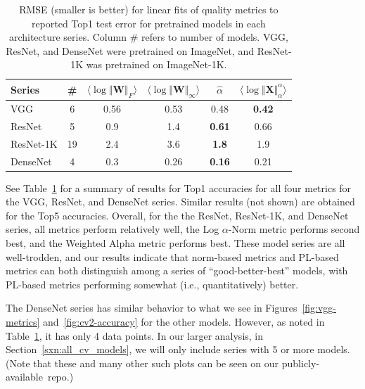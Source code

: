 \begin{table}[t]
\small
\begin{center}
\begin{tabular}{|p{1in}|c|c|c|c|c|}
\hline
 Series    &\#   & $\langle\log\Vert\mathbf{W}\Vert_{F}\rangle$ & $\langle\log\Vert\mathbf{W}\Vert_{\infty}\rangle$ & $\hat{\alpha}$ & $\langle\log\Vert\mathbf{X}\Vert^{\alpha}_{\alpha}\rangle$ \\
\hline
 VGG       &  6 & 0.56 & 0.53 & 0.48          & \textbf{0.42}  \\
 ResNet    &  5 & 0.9  & 1.4  & \textbf{0.61} & 0.66           \\
 ResNet-1K & 19 & 2.4  & 3.6  & \textbf{1.8}  & 1.9            \\
 DenseNet  &  4 & 0.3  & 0.26 & \textbf{0.16} & 0.21           \\
\hline
\end{tabular}
\end{center}
\caption{RMSE (smaller is better) for linear fits of 
         quality metrics to reported Top1 test error for pretrained models in each architecture series.  Column \# refers to number of models.  VGG, ResNet, and DenseNet were pretrained on ImageNet, and ResNet-1K was pretrained on ImageNet-1K. 
}
\label{table:cv-models}
\end{table}

See Table~\ref{table:cv-models} for a summary of results for Top1 accuracies for all four metrics for the VGG, ResNet, and DenseNet series.
Similar results (not shown) are obtained for the Top5 accuracies.
Overall, for the the ResNet, ResNet-1K, and DenseNet series, all metrics perform relatively well, the Log $\alpha$-Norm metric performs second best, and the Weighted Alpha metric performs best.
These model series are all well-trodden, and our results indicate that norm-based metrics and PL-based metrics can both distinguish among a series of ``good-better-best'' models, with PL-based metrics performing somewhat (i.e., quantitatively) better.

The DenseNet series has similar behavior to what we see in Figures~\ref{fig:vgg-metrics} and~\ref{fig:cv2-accuracy} for the other models.
However, as noted in Table~\ref{table:cv-models}, it has only 4 data points.  
In our larger analysis, in Section~\ref{sxn:all_cv_models}, we will only include series with 5 or more models.
(Note that these and many other such plots can be seen on our publicly-available~repo.)


